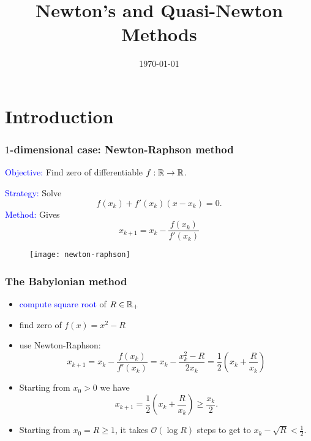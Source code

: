 \documentclass[aspectratio=149]{beamer}
\title{Newton's and Quasi-Newton Methods}
\date{\today}
\begin{document}
\maketitle
\frame{\tableofcontents[]}

\section{Introduction}

\begin{frame}
  \frametitle{$1$-dimensional case: Newton-Raphson method}
  \textcolor{blue}{Objective:} Find zero of differentiable $f: \mathbb{R} \to \mathbb{R}$.
  \vspace{0.3cm}
  \begin{minipage}{0.48\textwidth}
    \textcolor{blue}{Strategy:} Solve
    \begin{equation}
      f(x_k) + f'(x_k) (x - x_k) = 0.
    \end{equation}
    \textcolor{blue}{Method:} Gives
    \begin{equation}
      x_{k+1} = x_k - \frac{f(x_k)}{f'(x_k)}
    \end{equation}
  \end{minipage}
  \hfill
  \begin{minipage}{0.48\textwidth}
    \begin{figure}[ht]
      \centering
      \texttt{[image: newton-raphson]}
    \end{figure}
  \end{minipage}
\end{frame}

\begin{frame}
  \frametitle{The Babylonian method}
  \begin{itemize}
    \item \textcolor{blue}{compute square root} of $R \in \mathbb{R}_+$
    \item find zero of $f(x) = x^2 - R$
    \item use Newton-Raphson:
          \begin{equation}
            x_{k+1} = x_k - \frac{f(x_k)}{f'(x_k)} = x_k - \frac{x_k^2 - R}{2 x_k} = \frac12 \left( x_k + \frac{R}{x_k} \right)
          \end{equation}
    \item Starting from $x_0 > 0$ we have
          \begin{equation}
            x_{k+1} = \frac12 \left( x_k + \frac{R}{x_k} \right) \ge \frac{x_k}{2}.
          \end{equation}
    \item Starting from $x_0 = R \ge 1$, it takes $\mathcal{O}(\log R)$ steps to get to $x_k - \sqrt{R} < \frac12$.
  \end{itemize}
\end{frame}
\end{document}
